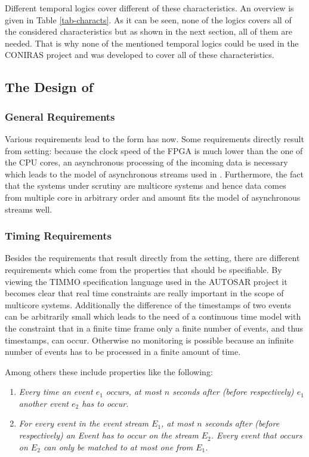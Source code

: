 Different temporal logics cover different of these characteristics. An overview is given in Table \ref{tab-characts}. As it can be seen, none of the logics covers all of the considered characteristics but as shown in the next section, all of them are needed. That is why none of the mentioned temporal logics could be used in the CONIRAS project and \tessla was developed to cover all of these characteristics.

\subsection{The Design of \tessla}

\subsubsection{General Requirements}

Various requirements lead to the form \tessla has now. Some requirements directly result from setting: because the clock speed of the FPGA is much lower than the one of the CPU cores, an asynchronous processing of the incoming data is necessary which leads to the model of asynchronous streams used in \tessla. Furthermore, the fact that the systems under scrutiny are multicore systems and hence data comes from multiple core in arbitrary order and amount fits the model of asynchronous streams well.

\subsubsection{Timing Requirements}

Besides the requirements that result directly from the setting, there are different requirements which come from the properties that should be specifiable. By viewing the TIMMO specification language used in the AUTOSAR project it becomes clear that real time constraints are really important in the scope of multicore systems. Additionally the difference of the timestamps of two events can be arbitrarily small which leads to the need of a continuous time model with the constraint that in a finite time frame only a finite number of events, and thus timestamps, can occur. Otherwise no monitoring is possible because an infinite number of events has to be processed in a finite amount of time.

Among others these include properties like the following:

\begin{enumerate}
	\item \textit{Every time an event $e_1$ occurs, at most $n$ seconds after (before respectively) $e_1$ another event $e_2$ has to occur.}
	\item \textit{For every event in the event stream $E_1$, at most $n$ seconds after (before respectively) an Event has to occur on the stream $E_2$. Every event that occurs on $E_2$ can only be matched to at most one from $E_1$.}
\end{enumerate}

